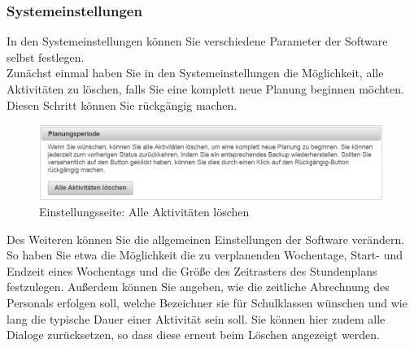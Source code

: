 \documentclass[fontsize=12pt]{scrartcl}
\begin{document}
\subsubsection{Systemeinstellungen}
In den Systemeinstellungen können Sie verschiedene Parameter der Software selbst festlegen.\\

Zunächst einmal haben Sie in den Systemeinstellungen die Möglichkeit, alle Aktivitäten zu löschen, falls Sie eine komplett neue Planung beginnen möchten. Diesen Schritt können Sie rückgängig machen. 

\begin{figure}[H]
\includegraphics[width=\textwidth]{images/systemSettings1.png}
\caption{Einstellungsseite: Alle Aktivitäten löschen}
\end{figure}

Des Weiteren können Sie die allgemeinen Einstellungen der Software verändern. So haben Sie etwa die Möglichkeit die zu verplanenden Wochentage, Start- und Endzeit eines Wochentags und die Größe des Zeitrasters des Stundenplans festzulegen. Außerdem können Sie angeben, wie die zeitliche Abrechnung des Personals erfolgen soll, welche Bezeichner sie für Schulklassen wünschen und wie lang die typische Dauer einer Aktivität sein soll. Sie können hier zudem alle Dialoge zurücksetzen, so dass diese erneut beim Löschen angezeigt werden. \\

\end{document}

